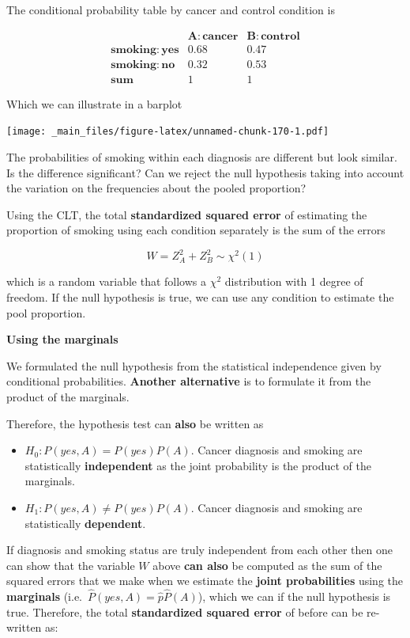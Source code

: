 \documentclass[
]{book}
\providecommand{\tightlist}{%
  \setlength{\itemsep}{0pt}\setlength{\parskip}{0pt}}
\begin{document}
The conditional probability table by cancer and control condition is

\[
\begin{array}{cc|c}
    & \mathbf{A:cancer} & \mathbf{B:control} \\ 
    \mathbf{smoking: yes} & 0.68 & 0.47 \\ 
    \mathbf{smoking: no} & 0.32 & 0.53 \\ 
    \mathbf{sum} & 1 & 1
\end{array}
\]

Which we can illustrate in a barplot

\texttt{[image: \_main\_files/figure-latex/unnamed-chunk-170-1.pdf]}

The probabilities of smoking within each diagnosis are different but look similar. Is the difference significant? Can we reject the null hypothesis taking into account the variation on the frequencies about the pooled proportion?

Using the CLT, the total \textbf{standardized squared error} of estimating the proportion of smoking using each condition separately is the sum of the errors

\[W= Z_A^2+Z_B^2\sim \chi^2(1)\]

which is a random variable that follows a \(\chi^2\) distribution with 1 degree of freedom. If the null hypothesis is true, we can use any condition to estimate the pool proportion.

\textbf{Using the marginals}

We formulated the null hypothesis from the statistical independence given by conditional probabilities. \textbf{Another alternative} is to formulate it from the product of the marginals.

Therefore, the hypothesis test can \textbf{also} be written as

\begin{itemize}
\tightlist
\item
  \(H_0:P(yes, A)=P(yes)P(A)\). Cancer diagnosis and smoking are statistically \textbf{independent} as the joint probability is the product of the marginals.
\item
  \(H_1:P(yes, A)\neq P(yes)P(A)\). Cancer diagnosis and smoking are statistically \textbf{dependent}.
\end{itemize}

If diagnosis and smoking status are truly independent from each other then one can show that the variable \(W\) above \textbf{can also} be computed as the sum of the squared errors that we make when we estimate the \textbf{joint probabilities} using the \textbf{marginals} (i.e.~\(\hat{P}(yes,A)=\hat{p}\hat{P}(A)\)), which we can if the null hypothesis is true. Therefore, the total \textbf{standardized squared error} of before can be re-written as:
\end{document}
